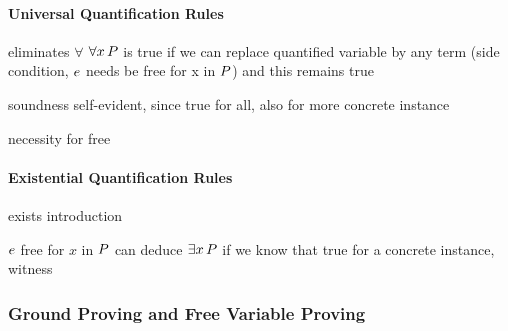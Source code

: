                 \paragraph{Universal Quantification Rules}
                    eliminates $\forall$
                    $\forall x{\,} P$ is true if we can replace quantified variable by any term (side condition, $e$ needs be free for x in $P$) and this remains true

                    \begin{calculus}
                    \end{calculus}

                    soundness self-evident, since true for all, also for more concrete instance

                    \begin{example}
                        necessity for free

                    \end{example}

                \paragraph{Existential Quantification Rules}
                    exists introduction

                    \begin{calculus}
                    \end{calculus}

                    $e$ free for $x$ in $P$
                    can deduce $\exists x{\,} P$ if we know that true for a concrete instance, witness

            \subsubsection{Ground Proving and Free Variable Proving}
                \label{sec:ground-proving-free-variable-proving}



